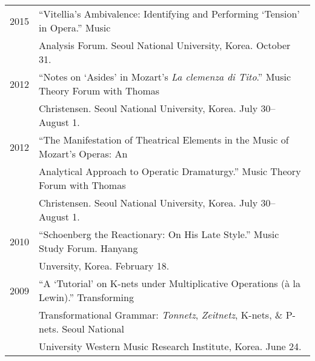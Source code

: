 \documentclass[a4paper,11pt]{article}
\begin{document}
  \hspace*{-0.25cm}
  \begin{tabular}{p{2.5cm} p{12.5cm}}
  2015 & “Vitellia’s Ambivalence: Identifying and Performing ‘Tension’ in Opera.” Music\\
  & Analysis Forum. Seoul National University, Korea. October 31.\\[2mm]
  
  
  2012 & “Notes on ‘Asides’ in Mozart’s \textit{La clemenza di Tito}.” Music Theory Forum with Thomas\\
  & Christensen. Seoul National University, Korea. July 30–August 1.\\[2mm]

  2012 & “The Manifestation of Theatrical Elements in the Music of Mozart’s Operas: An\\
  & Analytical Approach to Operatic Dramaturgy.” Music Theory Forum with Thomas\\
  & Christensen. Seoul National University, Korea. July 30–August 1.\\[2mm]

  2010 & “Schoenberg the Reactionary: On His Late Style.” Music Study Forum. Hanyang\\
  & Unversity, Korea. February 18.\\[2mm]
  
  2009 & “A ‘Tutorial’ on K-nets under Multiplicative Operations (à la Lewin).” Transforming\\
  & Transformational Grammar: \textit{Tonnetz}, \textit{Zeitnetz}, K-nets, \& P-nets. Seoul National\\
  & University Western Music Research Institute, Korea. June 24.
  \end{tabular}
  
  \vspace{2.5mm}
  
\end{document}
